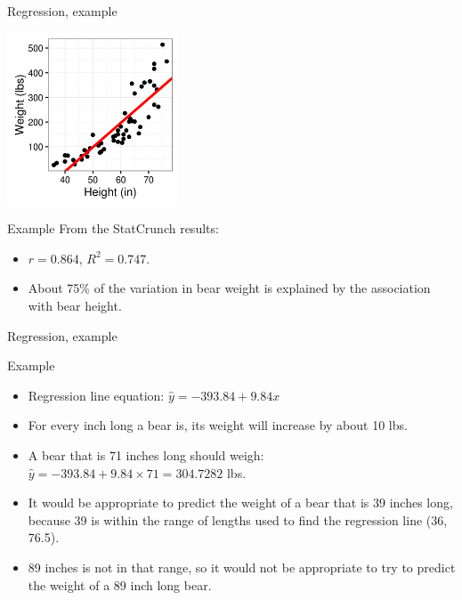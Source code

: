 \documentclass[xcolor=table]{beamer}
\begin{document}
\begin{frame}{Regression, example}

\smallskip
{\centering
\includegraphics[width=2in]{../images/ch10_reg_bears}
\par}

\pause
\begin{exampleblock}{Example}
From the StatCrunch results:
\begin{itemize}
\item $r = 0.864$, $R^2 = 0.747$.
\item About 75\% of the variation in bear weight is explained by the association with bear height.
\end{itemize}
\end{exampleblock}

\end{frame}

\begin{frame}{Regression, example}
\begin{exampleblock}{Example}
\begin{itemize}
\item Regression line equation: $\hat y = -393.84 + 9.84 x$
\pause\item For every inch long a bear is, its weight will increase by about 10 lbs.
\pause\item A bear that is 71 inches long should weigh:  $\hat y = -393.84 + 9.84 \times 71= 304.7282$ lbs.
\pause\item It would be appropriate to predict the weight of a bear that is 39 inches long, because 39 is within the range of lengths used to find the regression line (36, 76.5).
\pause\item 89 inches is not in that range, so it would not be appropriate to try to predict the weight of a 89 inch long bear.
\end{itemize}
\end{exampleblock}

\end{frame}
\end{document}
